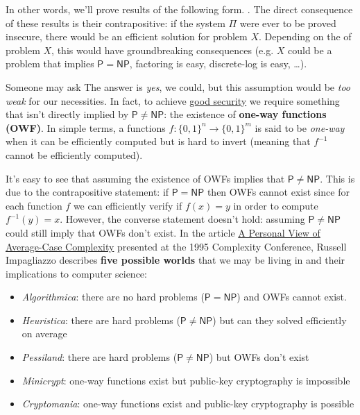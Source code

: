 \documentclass[a4paper, 12pt]{report}
\begin{document}
    In other words, we'll prove results of the following form. . The direct consequence of these results is their contrapositive: if the system $\Pi$ were ever to be proved insecure, there would be an efficient solution for problem $X$. Depending on the  of problem $X$, this would have groundbreaking consequences (e.g. $X$ could be a problem that implies $\mathsf{P} = \mathsf{NP}$, factoring is easy, discrete-log is easy, \dots).

    Someone may ask  The answer is \textit{yes}, we could, but this assumption would be \textit{too weak} for our necessities. In fact, to achieve \underline{good security} we require something that isn't directly implied by $\mathsf{P} \neq \mathsf{NP}$: the existence of \textbf{one-way functions (OWF)}. In simple terms, a functions $f : \{0,1\}^n \to \{0,1\}^m$ is said to be \textit{one-way} when it can be efficiently computed but is hard to invert (meaning that $f^{-1}$ cannot be efficiently computed).
    
    It's easy to see that assuming the existence of OWFs implies that $\mathsf{P} \neq \mathsf{NP}$. This is due to the contrapositive statement: if $\mathsf{P} = \mathsf{NP}$ then OWFs cannot exist since for each function $f$ we can efficiently verify if $f(x) = y$ in order to compute $f^{-1}(y) = x$. However, the converse statement doesn't hold: assuming $\mathsf{P} \neq \mathsf{NP}$ could still imply that OWFs don't exist. In the article \href{https://dx.doi.org/10.1109/SCT.1995.514853}{A Personal View of Average-Case Complexity} presented at the 1995 Complexity Conference, Russell Impagliazzo describes \textbf{five possible worlds} that we may be living in and their implications to computer science:
    \begin{itemize}
        \item \textit{Algorithmica}: there are no hard problems ($\mathsf{P} = \mathsf{NP}$) and OWFs cannot exist.
        \item \textit{Heuristica}: there are hard problems ($\mathsf{P} \neq \mathsf{NP}$) but can they solved efficiently on average
        \item \textit{Pessiland}: there are hard problems ($\mathsf{P} \neq \mathsf{NP}$) but OWFs don't exist
        \item \textit{Minicrypt}: one-way functions exist but public-key cryptography is impossible 
        \item \textit{Cryptomania}: one-way functions exist and public-key cryptography is possible
    \end{itemize}
\end{document}
